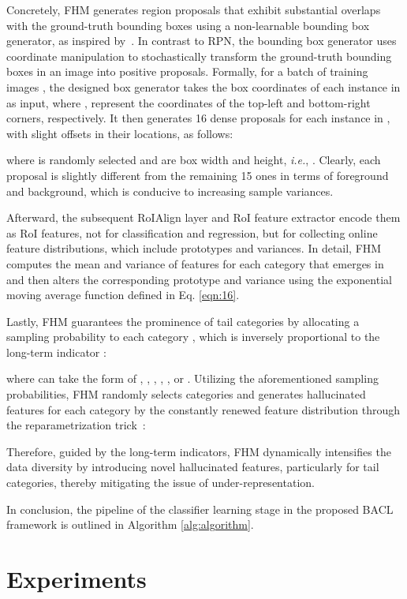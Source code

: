 \documentclass[lettersize,journal]{IEEEtran}
\begin{document}
Concretely, FHM generates region proposals that exhibit substantial overlaps with the ground-truth bounding boxes using a non-learnable bounding box generator, as inspired by~\cite{feng2021exploring}.
In contrast to RPN, the bounding box generator uses coordinate manipulation to stochastically transform the ground-truth bounding boxes in an image into positive proposals.
Formally, for a batch of training images , the designed box generator takes the box coordinates  of each instance in  as input, where ,  represent the coordinates of the top-left and bottom-right corners, respectively.
It then generates 16 dense proposals for each instance in , with slight offsets in their locations, as follows:

where  is randomly selected and  are box width and height, {\em i.e.}, .
Clearly, each proposal is slightly different from the remaining 15 ones in terms of foreground and background, which is conducive to increasing sample variances.

Afterward, the subsequent RoIAlign layer and RoI feature extractor encode them as RoI features, not for classification and regression, but for collecting online feature distributions, which include prototypes and variances.
In detail, FHM computes the mean  and variance  of features for each category  that emerges in  and then alters the corresponding prototype  and variance  using the exponential moving average function defined in Eq. \eqref{eqn:16}.



Lastly, FHM guarantees the prominence of tail categories by allocating a sampling probability  to each category , which is inversely proportional to the long-term indicator :

where  can take the form of , , , , , or .
Utilizing the aforementioned sampling probabilities, FHM randomly selects  categories and generates  hallucinated features for each category  by the constantly renewed feature distribution through the reparametrization trick~\cite{kingma2013auto}:


Therefore, guided by the long-term indicators, FHM dynamically intensifies the data diversity by introducing novel hallucinated features, particularly for tail categories, thereby mitigating the issue of under-representation.

In conclusion, the pipeline of the classifier learning stage in the proposed BACL framework is outlined in Algorithm \ref{alg:algorithm}.



\section{Experiments}
\end{document}
